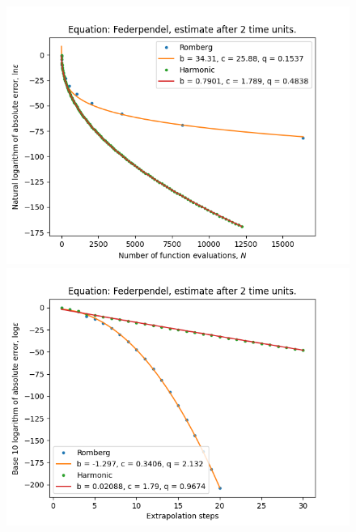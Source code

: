 \begin{figure}[H]
\centering
\begin{minipage}{0.45\textwidth}
\centering
\includegraphics[scale=0.45]{emr_plots/federpendel_2_hp_trend.png}
\end{minipage}
\begin{minipage}{0.45\textwidth}
\centering
\includegraphics[scale=0.45]{emr_plots/federpendel_2_hp_steps.png}
\end{minipage}
\end{figure}

